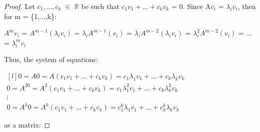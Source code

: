     \begin{proof}
        Let $c_1,...,c_k$ $\in$ $\mathbb{R}$ be such that
        $c_1v_1 + ... + c_kv_k$ = 0.
        Since A$v_i$ = $\lambda_i v_i$, then for m = \{1,...,k\}:

        \hspace{0.5cm}
        $A^m v_i$
        = $A^{m-1}(\lambda_i v_i)$
        = $\lambda_i A^{m-1}(v_i)$
        = $\lambda_i A^{m-2}(\lambda_i v_i)$
        = $\lambda_i^2 A^{m-2}(v_i)$
        = ...
        = $\lambda_i^m v_i$

        Thus, the system of equations:

        \hspace{0.5cm}
        \footnotesize
        $\begin{matrix*}[l]
            0
            = A0
            = A(c_1v_1 + ... + c_kv_k)
            = c_1\lambda_1 v_1 + ... + c_k\lambda_k v_k \\
            0
            = A^20
            = A^2(c_1v_1 + ... + c_kv_k)
            = c_1\lambda_1^2 v_1 + ... + c_k\lambda_k^2 v_k \\
            \vdots \\
            0
            = A^k0
            = A^k(c_1v_1 + ... + c_kv_k)
            = c_1^k\lambda_1 v_1 + ... + c_k^k\lambda_k v_k
        \end{matrix*}$
        \normalsize

        as a matrix:


\end{proof}
